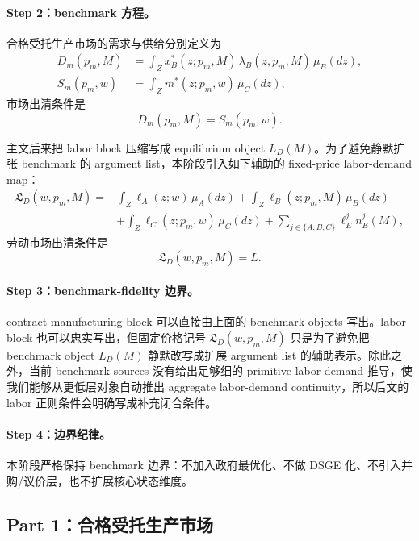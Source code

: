 \paragraph{Step 2：benchmark 方程。}
合格受托生产市场的需求与供给分别定义为
\begin{align}
D_m(p_m,M)
&=\int_Z x_B^*(z;p_m,M)\,\lambda_B(z,p_m,M)\,\mu_B(dz),
\label{eq:p6zh_Dm}\\
S_m(p_m,w)
&=\int_Z m^*(z;p_m,w)\,\mu_C(dz),
\label{eq:p6zh_Sm}
\end{align}
市场出清条件是
\begin{equation}
D_m(p_m,M)=S_m(p_m,w).
\label{eq:p6zh_pm_clear}
\end{equation}

主文后来把 labor block 压缩写成 equilibrium object $L_D(M)$。为了避免静默扩张 benchmark 的 argument list，本阶段引入如下辅助的 fixed-price labor-demand map：
\begin{equation}
\begin{aligned}
\mathfrak L_D(w,p_m,M)={}&\int_Z \ell_A(z;w)\,\mu_A(dz)
+\int_Z \ell_B(z;p_m,M)\,\mu_B(dz)\\
&+\int_Z \ell_C(z;p_m,w)\,\mu_C(dz)
+\sum_{j\in\{A,B,C\}}\ell_E^j n_E^j(M),
\end{aligned}
\label{eq:p6zh_LD_aux}
\end{equation}
劳动市场出清条件是
\begin{equation}
\mathfrak L_D(w,p_m,M)=\bar L.
\label{eq:p6zh_labor_clear}
\end{equation}

\paragraph{Step 3：benchmark-fidelity 边界。}
contract-manufacturing block 可以直接由上面的 benchmark objects 写出。labor block 也可以忠实写出，但固定价格记号 $\mathfrak L_D(w,p_m,M)$ 只是为了避免把 benchmark object $L_D(M)$ 静默改写成扩展 argument list 的辅助表示。除此之外，当前 benchmark sources 没有给出足够细的 primitive labor-demand 推导，使我们能够从更低层对象自动推出 aggregate labor-demand continuity，所以后文的 labor 正则条件会明确写成补充闭合条件。

\paragraph{Step 4：边界纪律。}
本阶段严格保持 benchmark 边界：不加入政府最优化、不做 DSGE 化、不引入并购/议价层，也不扩展核心状态维度。

\subsection{Part 1：合格受托生产市场}


